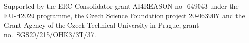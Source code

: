 \documentclass{ceurart}
\begin{document}
\begin{acknowledgments}
Supported by the ERC Consolidator grant AI4REASON no.~649043 under the EU-H2020 programme,
the Czech Science Foundation project 20-06390Y and
the Grant Agency of the Czech Technical University in Prague, grant no.~SGS20/215/OHK3/3T/37.
\end{acknowledgments}



\end{document}
